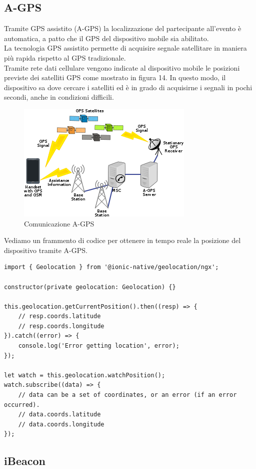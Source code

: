 \subsection{A-GPS}

Tramite GPS assistito (A-GPS) la localizzazione del partecipante all'evento è automatica,
a patto che il GPS del dispositivo mobile sia abilitato.\\
La tecnologia GPS assistito permette di acquisire segnale satellitare in maniera più rapida
rispetto al GPS tradizionale.\\
Tramite rete dati cellulare vengono indicate al dispositivo mobile le posizioni previste dei
satelliti GPS come mostrato in figura 14. In questo modo, il dispositivo sa dove cercare i satelliti ed è in grado di acquisirne 
i segnali in pochi secondi, anche in condizioni difficili.
\begin{figure}[H]
    \centering  
    \caption{Comunicazione A-GPS}
    \includegraphics[scale=0.7]{img/cap2/gps}
\end{figure}
Vediamo un frammento di codice per ottenere in tempo reale la 
posizione del dispositivo tramite A-GPS.
\begin{lstlisting}
import { Geolocation } from '@ionic-native/geolocation/ngx';

constructor(private geolocation: Geolocation) {}

this.geolocation.getCurrentPosition().then((resp) => {
    // resp.coords.latitude
    // resp.coords.longitude
}).catch((error) => {
    console.log('Error getting location', error);
});

let watch = this.geolocation.watchPosition();
watch.subscribe((data) => {
    // data can be a set of coordinates, or an error (if an error occurred).
    // data.coords.latitude
    // data.coords.longitude
});
\end{lstlisting}

\subsection{iBeacon}

